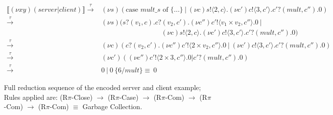 \begin{figure}[h]
    \centering
    \begin{align*} 
        \llbracket (\nu xy) (server | client) \rrbracket \xrightarrow{\tau} & (\nu s) (\text{case } mult\_s \text{ of } \{...\} \: | \: (\nu c) s!\langle 2, c \rangle.(\nu c')c!\langle 3, c' \rangle.c'?(mult, c'').0) \\
        \xrightarrow{\tau} \:& (\nu s) (s?(v_1, c).c?(v_2, c').(\nu c'')c'!\langle v_1 \times v_2, c'' \rangle.0 \:| \\
        & \hspace{105pt}(\nu c) s!\langle 2, c \rangle.(\nu c')c!\langle 3, c' \rangle.c'?(mult, c'').0) \\
        \xrightarrow{\tau} \:& (\nu c) (c?(v_2, c').(\nu c'')c'!\langle 2 \times v_2, c'' \rangle.0 \: | \: (\nu c') c!\langle 3, c' \rangle.c'?(mult, c'').0) \\
        \xrightarrow{\tau} \:& (\nu c') ((\nu c'') c'!\langle 2 \times 3, c'' \rangle.0 | c'?(mult, c'').0) \\
        \xrightarrow{\tau} \:& 0 \: | \: 0 \: \{6 / mult\} \equiv \:0
    \end{align*}
    \caption{Full reduction sequence of the encoded server and client example; Rules applied are: (R$\pi$-Close) $\rightarrow$ (R$\pi$-Case) $\rightarrow$ (R$\pi$-Com) $\rightarrow$ (R$\pi$-Com) $\rightarrow$ (R$\pi$-Com) $\equiv$ Garbage Collection.}
    \label{fig:encodedReduction}
\end{figure}





